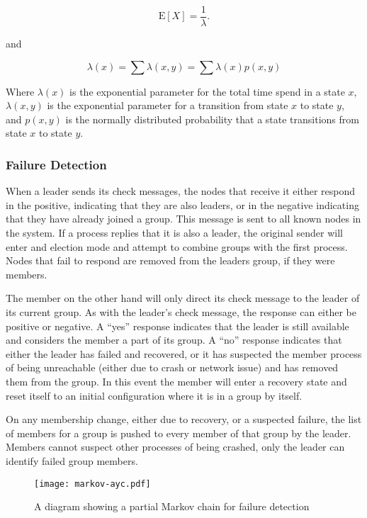\begin{equation}
\mathrm{E}[X] = \frac{1}{\lambda}. \!
\end{equation}

and

\begin{equation}
\lambda(x) = \sum \lambda(x,y) = \sum \lambda(x) p(x,y)
\end{equation}

Where $\lambda(x)$ is the exponential parameter for the total time spend in
a state $x$, $\lambda(x,y)$ is the exponential parameter for a transition from
state $x$ to state $y$, and $p(x,y)$ is the normally distributed probability that
a state transitions from state $x$ to state $y$.

\subsubsection{Failure Detection}
When a leader sends its check messages, the nodes that receive it either
respond in the positive, indicating that they are also leaders, or in the
negative indicating that they have already joined a group. This message is sent
to all known nodes in the system. If a process replies that it is also a
leader, the original sender will enter and election mode and attempt to combine
groups with the first process. Nodes that fail to respond are removed from the
leaders group, if they were members.

The member on the other hand will only direct its check message to the leader
of its current group. As with the leader's check message, the response can
either be positive or negative. A ``yes'' response indicates that the leader is
still available and considers the member a part of its group. A ``no'' response
indicates that either the leader has failed and recovered, or it has suspected
the member process of being unreachable (either due to crash or network issue)
and has removed them from the group. In this event the member will enter a
recovery state and reset itself to an initial configuration where it is in a
group by itself.

On any membership change, either due to recovery, or a suspected failure, the
list of members for a group is pushed to every member of that group by the
leader. Members cannot suspect other processes of being crashed, only the
leader can identify failed group members.

\begin{figure*}
\centering
\texttt{[image: markov-ayc.pdf]}
\caption{A diagram showing a partial Markov chain for failure detection}
\label{fig:MARKOVAYC}
\end{figure*}

